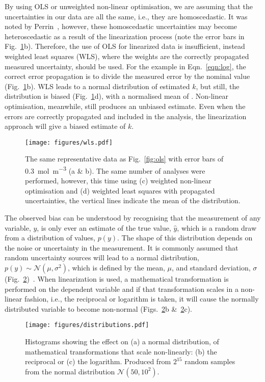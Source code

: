 \documentclass[journal=jceda8,manuscript=article]{achemso}
\begin{document}
By using OLS or unweighted non-linear optimisation, we are assuming that the uncertainties in our data are all the same, i.e., they are homoscedastic. 
It was noted by Perrin~\cite{perrin_linear_2017}, however, these homoscedastic uncertainties may become heteroscedastic as a result of the linearization process (note the error bars in Fig.~\ref{fig:wls}b). 
Therefore, the use of OLS for linearized data is insufficient, instead weighted least squares (WLS), where the weights are the correctly propagated measured uncertainty, should be used.
For the example in Eqn.~\ref{eqn:log}, the correct error propagation is to divide the measured error by the nominal value (Fig.~\ref{fig:wls}b).
WLS leads to a normal distribution of estimated $k$, but still, the distribution is biased (Fig.~\ref{fig:wls}d), with a normalised mean of .
Non-linear optimisation, meanwhile, still produces an unbiased estimate.
Even when the errors are correctly propagated and included in the analysis, the linearization approach will give a biased estimate of $k$.
%
\begin{figure}
  \texttt{[image: figures/wls.pdf]}
  \caption{
    The same representative data as Fig.~\ref{fig:ols} with error bars of \SI{0.3}{{\mol\m^{-3}}} (a \& b).
    The same number of analyses were performed, however, this time using (c) weighted non-linear optimisation and (d) weighted least squares with propagated uncertainties, the vertical lines indicate the mean of the distribution. 
    }
  \label{fig:wls}
\end{figure}
%

The observed bias can be understood by recognising that the measurement of any variable, $y$, is only ever an estimate of the true value, $\hat{y}$, which is a random draw from a distribution of values, $p(y)$. 
The shape of this distribution depends on the noise or uncertainty in the measurement. 
It is commonly assumed that random uncertainty sources will lead to a normal distribution, $p(y) \sim \mathcal{N}(\mu, \sigma^2)$, which is defined by the mean, $\mu$, and standard deviation, $\sigma$ (Fig.~\ref{fig:distributions})~\cite{monk_math_2010}.
When linearization is used, a mathematical transformation is performed on the dependent variable and if that transformation scales in a non-linear fashion, i.e., the reciprocal or logarithm is taken, it will cause the normally distributed variable to become non-normal (Figs.~\ref{fig:distributions}b \&~\ref{fig:distributions}c).
%
\begin{figure}
  \texttt{[image: figures/distributions.pdf]}
  \caption{  
    Histograms showing the effect on (a) a normal distribution, of mathematical transformations that scale non-linearly: (b) the reciprocal or (c) the logarithm. 
    Produced from $2^{15}$ random samples from the normal distribution $\mathcal{N}(50, 10^2)$.
    }
  \label{fig:distributions}
\end{figure}
%
\end{document}
